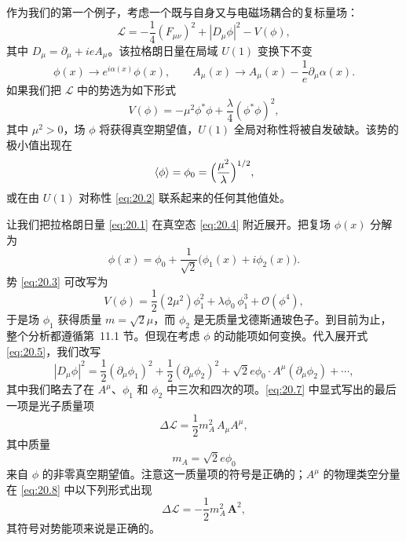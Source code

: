 作为我们的第一个例子，考虑一个既与自身又与电磁场耦合的复标量场：
\begin{equation}
  \mathcal{L} = -\frac{1}{4}(F_{\mu\nu})^2 + |D_\mu\phi|^2 - V(\phi),
  \label{eq:20.1}
\end{equation}
其中 $D_\mu = \partial_\mu + ieA_\mu$。该拉格朗日量在局域 $U(1)$ 变换下不变
\begin{equation}
  \phi(x) \to e^{i\alpha(x)}\phi(x),\qquad
  A_\mu(x) \to A_\mu(x) - \frac{1}{e}\partial_\mu\alpha(x) .
  \label{eq:20.2}
\end{equation}
如果我们把 $\mathcal{L}$ 中的势选为如下形式
\begin{equation}
  V(\phi) = -\mu^2\phi^{*}\phi + \frac{\lambda}{4}(\phi^{*}\phi)^2 ,
  \label{eq:20.3}
\end{equation}
其中 $\mu^2 > 0$，场 $\phi$ 将获得真空期望值，$U(1)$ 全局对称性将被自发破缺。该势的极小值出现在
\begin{equation}
  \langle\phi\rangle = \phi_0 = \Bigl( \frac{\mu^2}{\lambda} \Bigr)^{1/2} ,
  \label{eq:20.4}
\end{equation}
或在由 $U(1)$ 对称性 \eqref{eq:20.2} 联系起来的任何其他值处。

让我们把拉格朗日量 \eqref{eq:20.1} 在真空态 \eqref{eq:20.4} 附近展开。把复场 $\phi(x)$ 分解为
\begin{equation}
  \phi(x) = \phi_0 + \frac{1}{\sqrt{2}}\bigl( \phi_1(x) + i\phi_2(x) \bigr) .
  \label{eq:20.5}
\end{equation}
势 \eqref{eq:20.3} 可改写为
\begin{equation}
  V(\phi) = \frac{1}{2}(2\mu^2)\phi_1^2 + \lambda\phi_0\,\phi_1^3
    + \mathcal{O}(\phi^4) ,
  \label{eq:20.6}
\end{equation}
于是场 $\phi_1$ 获得质量 $m = \sqrt{2}\mu$，而 $\phi_2$ 是无质量戈德斯通玻色子。到目前为止，整个分析都遵循第~11.1 节。但现在考虑 $\phi$ 的动能项如何变换。代入展开式 \eqref{eq:20.5}，我们改写
\begin{equation}
  |D_\mu\phi|^2 = \frac{1}{2}(\partial_\mu\phi_1)^2 + \frac{1}{2}
    (\partial_\mu\phi_2)^2 + \sqrt{2}e\phi_0\cdot A^\mu(\partial_\mu\phi_2)
      + \cdots ,
  \label{eq:20.7}
\end{equation}
其中我们略去了在 $A^\mu$、$\phi_1$ 和 $\phi_2$ 中三次和四次的项。\eqref{eq:20.7} 中显式写出的最后一项是光子质量项
\begin{equation}
  \Delta\mathcal{L} = \frac{1}{2}m_A^2\,A_\mu A^\mu ,
  \label{eq:20.8}
\end{equation}
其中质量
\begin{equation}
  m_A = \sqrt{2}e\phi_0
  \label{eq:20.9}
\end{equation}
来自 $\phi$ 的非零真空期望值。注意这一质量项的符号是正确的；$A^\mu$ 的物理类空分量在 \eqref{eq:20.8} 中以下列形式出现
\begin{equation}
  \Delta\mathcal{L} = -\frac{1}{2}m_A^2\,\mathbf{A}^2 ,
\end{equation}
其符号对势能项来说是正确的。

